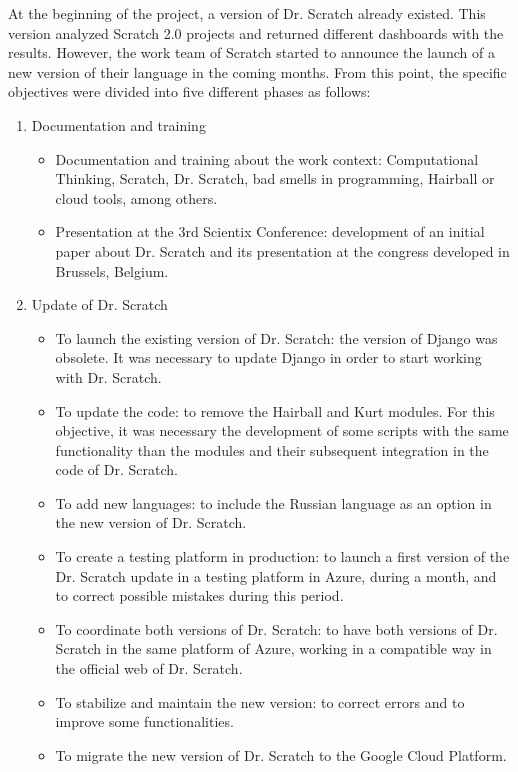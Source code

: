 At the beginning of the project, a version of Dr. Scratch already existed. This version analyzed Scratch 2.0 projects and returned different dashboards with the results. However, the work team of Scratch started to announce the launch of a new version of their language in the coming months. From this point, the specific objectives were divided into five different phases as follows:

\begin{enumerate}
    \item Documentation and training
    \begin{itemize}
        \item Documentation and training about the work context: Computational Thinking, Scratch, Dr. Scratch, bad smells in programming, Hairball or cloud tools, among others.
        \item Presentation at the 3rd Scientix Conference: development of an initial paper about Dr. Scratch and its presentation at the congress developed in Brussels, Belgium.
    \end{itemize}
    \item Update of Dr. Scratch
    \begin{itemize}
        \item To launch the existing version of Dr. Scratch: the version of Django was obsolete. It was necessary to update Django in order to start working with Dr. Scratch. 
        \item To update the code: to remove the Hairball and Kurt modules. For this objective, it was necessary the development of some scripts with the same functionality than the modules and their subsequent integration in the code of Dr. Scratch.
        \item To add new languages: to include the Russian language as an option in the new version of Dr. Scratch.
        \item To create a testing platform in production: to launch a first version of the Dr. Scratch update in a testing platform in Azure, during a month, and to correct possible mistakes during this period.
        \item To coordinate both versions of Dr. Scratch: to have both versions of Dr. Scratch in the same platform of Azure, working in a compatible way in the official web of Dr. Scratch.
        \item To stabilize and maintain the new version: to correct errors and to improve some functionalities.
        \item To migrate the new version of Dr. Scratch to the Google Cloud Platform.

\end{itemize}
\end{enumerate}
